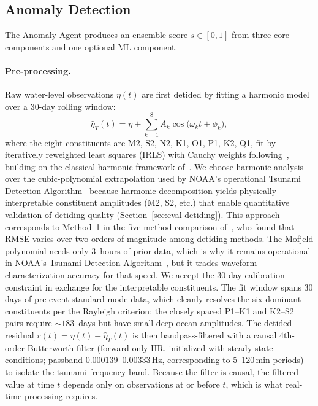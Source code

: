 \documentclass{article}
\begin{document}
\subsection{Anomaly Detection}
\label{sec:anomaly}

The Anomaly Agent produces an ensemble score $s \in [0,1]$ from
three core components and one optional ML component.

\paragraph{Pre-processing.}
Raw water-level observations $\eta(t)$ are first detided by fitting
a harmonic model over a 30-day rolling window:
\begin{equation}
  \hat{\eta}_T(t) = \bar{\eta} + \sum_{k=1}^{8}
    A_k \cos\!\bigl(\omega_k t + \phi_k\bigr),
  \label{eq:tidal}
\end{equation}
where the eight constituents are M2, S2, N2, K1, O1, P1, K2, Q1,
fit by iteratively reweighted least squares (IRLS) with Cauchy
weights following~\citet{codiga2011unified}, building on the classical
harmonic framework of~\citet{pawlowicz2002classical}.
We choose harmonic analysis over the cubic-polynomial extrapolation
used by NOAA's operational Tsunami Detection Algorithm~\citep{mofjeld1997tsunami}
because harmonic decomposition yields physically interpretable
constituent amplitudes (M2, S2, etc.) that enable quantitative
validation of detiding quality (Section~\ref{sec:eval-detiding}).
This approach corresponds to Method~1 in the five-method comparison
of~\citet{percival2015detiding}, who found that RMSE varies over two
orders of magnitude among detiding methods.  The Mofjeld polynomial
needs only 3~hours of prior data, which is why it remains operational
in NOAA's Tsunami Detection Algorithm~\citep{mofjeld1997tsunami}, but
it trades waveform characterization accuracy for that speed.  We
accept the 30-day calibration constraint in exchange for the
interpretable constituents.
The fit window spans 30 days of pre-event standard-mode data,
which cleanly resolves the six dominant constituents per the
Rayleigh criterion; the closely spaced P1--K1 and K2--S2 pairs require
${\sim}183$~days but have small deep-ocean amplitudes.
The detided residual $r(t) = \eta(t) - \hat{\eta}_T(t)$ is then
bandpass-filtered with a causal 4th-order Butterworth filter
(forward-only IIR, initialized with steady-state conditions;
passband $0.000139$--$0.00333$\,Hz, corresponding to 5--120\,min periods)
to isolate the tsunami frequency band.  Because the filter is causal,
the filtered value at time $t$ depends only on observations at or
before $t$, which is what real-time processing requires.
\end{document}

